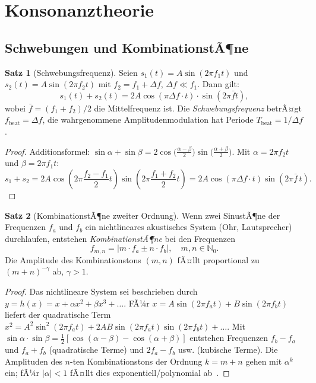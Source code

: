 ﻿\documentclass[a4paper,12pt]{article}
\theoremstyle{definition}
\newtheorem{satz}{Satz}
\begin{document}
\section{Konsonanztheorie}

\subsection{Schwebungen und KombinationstÃ¶ne}

\begin{satz}[Schwebungsfrequenz]
\label{satz:schwebung}
Seien $s_1(t) = A\sin(2\pi f_1 t)$ und $s_2(t) = A\sin(2\pi f_2 t)$ mit
$f_2 = f_1 + \Delta f$, $\Delta f \ll f_1$. Dann gilt:
\[
s_1(t) + s_2(t) = 2A\cos\!\left(\pi \Delta f \cdot t\right) \cdot
\sin\!\left(2\pi \bar{f} t\right),
\]
wobei $\bar{f} = (f_1 + f_2)/2$ die Mittelfrequenz ist.
Die \emph{Schwebungsfrequenz} betrÃ¤gt $f_{\mathrm{beat}} = \Delta f$, die
wahrgenommene Amplitudenmodulation hat Periode $T_{\mathrm{beat}} = 1/\Delta f$.
\end{satz}

\begin{proof}
Additionsformel: $\sin \alpha + \sin \beta = 2\cos\bigl(\frac{\alpha-\beta}{2}\bigr)
\sin\bigl(\frac{\alpha+\beta}{2}\bigr)$.
Mit $\alpha = 2\pi f_2 t$ und $\beta = 2\pi f_1 t$:
\[
s_1+s_2 = 2A\cos\!\left(2\pi \frac{f_2-f_1}{2} t\right)
            \sin\!\left(2\pi \frac{f_1+f_2}{2} t\right)
= 2A\cos(\pi\Delta f\cdot t)\sin(2\pi\bar{f}\,t).
\]
\end{proof}

\begin{satz}[KombinationstÃ¶ne zweiter Ordnung]
\label{satz:kombi}
Wenn zwei SinustÃ¶ne der Frequenzen $f_a$ und $f_b$ ein nichtlineares
akustisches System (Ohr, Lautsprecher) durchlaufen, entstehen
\emph{KombinationstÃ¶ne} bei den Frequenzen
\[
f_{m,n} = |m \cdot f_a \pm n \cdot f_b|, \quad m, n \in \mathbb{N}_0.
\]
Die Amplitude des Kombinationstons $(m,n)$ fÃ¤llt proportional zu
$(m+n)^{-\gamma}$ ab, $\gamma > 1$.
\end{satz}

\begin{proof}
Das nichtlineare System sei beschrieben durch $y = h(x) = x + \alpha x^2 + \beta x^3 + \ldots$.
FÃ¼r $x = A\sin(2\pi f_a t) + B\sin(2\pi f_b t)$ liefert der quadratische Term
$x^2 = A^2\sin^2(2\pi f_a t) + 2AB\sin(2\pi f_a t)\sin(2\pi f_b t) + \ldots$.
Mit $\sin\alpha\cdot\sin\beta = \frac{1}{2}[\cos(\alpha-\beta) - \cos(\alpha+\beta)]$
entstehen Frequenzen $f_b - f_a$ und $f_a + f_b$ (quadratische Terme) und
$2f_a - f_b$ usw. (kubische Terme). Die Amplituden des $n$-ten Kombinationstons
der Ordnung $k = m+n$ gehen mit $\alpha^k$ ein; fÃ¼r $|\alpha| < 1$ fÃ¤llt dies
exponentiell/polynomial ab~\cite{roederer2008}.
\end{proof}
\end{document}
